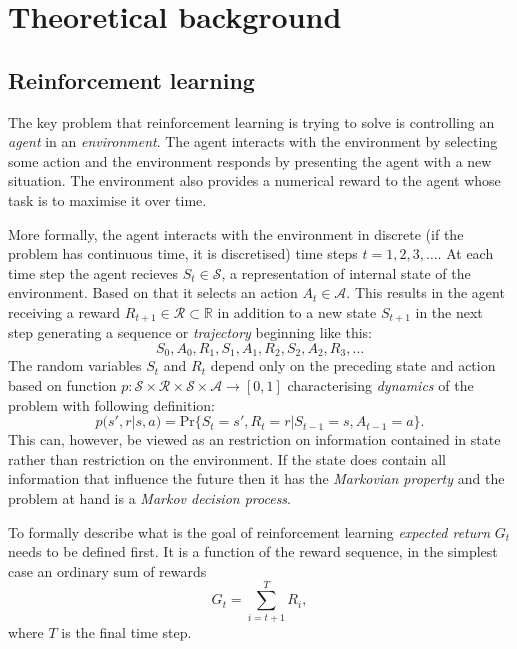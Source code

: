 \chapter{Theoretical background}


\section{Reinforcement learning}
\label{sec:reinf}
The key problem that reinforcement learning is trying to solve is controlling an \emph{agent} in an \emph{environment}. The agent interacts with the environment by selecting some action and the environment responds by presenting the agent with a new situation. The environment also provides a numerical reward to the agent whose task is to maximise it over time.

More formally, the agent interacts with the environment in discrete (if the problem has continuous time, it is discretised) time steps $t=1,2,3,\dots$. At each time step the agent recieves $S_t\in\mathcal{S}$, a representation of internal state of the environment. Based on that it selects an action $A_t\in\mathcal{A}$. This results in the agent receiving a reward $R_{t+1}\in \mathcal{R}\subset \mathbb{R}$ in addition to a new state $S_{t+1}$ in the next step generating a sequence or \emph{trajectory} beginning like this:
\begin{equation}
    S_0,A_0,R_1,S_1,A_1,R_2,S_2,A_2,R_3,\dots
\end{equation}
The random variables $S_t$ and $R_t$ depend only on the preceding state and action based on function $p: \mathcal{S} \times \mathcal{R} \times \mathcal{S} \times\mathcal{A} \rightarrow [0,1]$ characterising \emph{dynamics} of the problem with following definition:
\begin{equation}
    p(s',r|s,a) = \text{Pr}\{S_t=s',R_t=r|S_{t-1}=s, A_{t-1}=a\}.
\end{equation}
This can, however, be viewed as an restriction on information contained in state rather than restriction on the environment. If the state does contain all information that influence the future then it has the \emph{Markovian property} and the problem at hand is a \emph{Markov decision process}.

To formally describe what is the goal of reinforcement learning \emph{expected return} $G_t$ needs to be defined first. It is a function of the reward sequence, in the simplest case an ordinary sum of rewards 
\begin{equation}
    \label{eq:exp-ret}
    G_t = \sum_{i=t+1}^TR_i,
\end{equation}
where $T$ is the final time step. 

